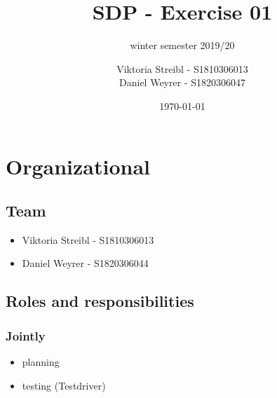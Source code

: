 


\title{SDP - Exercise 01} %
\subtitle{winter semester 2019/20} %
\author{
Viktoria Streibl - S1810306013\\
  Daniel Weyrer - S1820306047
} %
\date{\today} %

\maketitle %

\newpage
\tableofcontents %
\newpage


\section{Organizational}
\subsection{Team}
\begin{itemize}
	\item Viktoria 	Streibl 		- 	S1810306013
	\item Daniel 	Weyrer		-	S1820306044
\end{itemize}

\subsection{Roles and responsibilities}

\subsubsection{Jointly}
\begin{itemize}
	\item planning
	\item testing (Testdriver)
\end{itemize}

